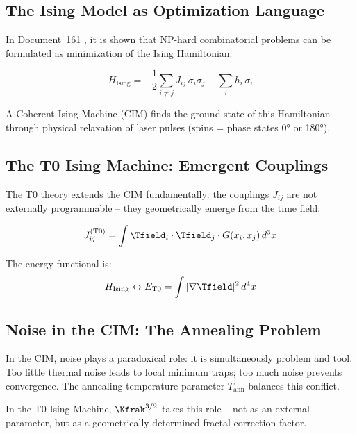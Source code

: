 \subsection{The Ising Model as Optimization Language}

In Document~161 \cite{pascher:ising}, it is shown that NP-hard combinatorial
problems can be formulated as minimization of the Ising Hamiltonian:

\begin{equation}
    H_{\text{Ising}} = -\frac{1}{2} \sum_{i \neq j} J_{ij} \, \sigma_i \sigma_j
    - \sum_i h_i \, \sigma_i
    \label{eq:ising}
\end{equation}

A Coherent Ising Machine (CIM) finds the ground state of this Hamiltonian through
physical relaxation of laser pulses (spins = phase states 0° or 180°).

\subsection{The T0 Ising Machine: Emergent Couplings}

The T0 theory extends the CIM fundamentally: the couplings $J_{ij}$ are not
externally programmable -- they geometrically emerge from the time field:

\begin{equation}
    J_{ij}^{(\text{T0})} = \int \Tfield_i \cdot \Tfield_j \cdot G(x_i, x_j) \, d^3x
    \label{eq:t0_coupling}
\end{equation}

The energy functional is:
\begin{equation}
    H_{\text{Ising}} \leftrightarrow E_{\text{T0}} = \int |\nabla \Tfield|^2 \, d^4x
    \label{eq:energy_equiv}
\end{equation}

\subsection{Noise in the CIM: The Annealing Problem}

In the CIM, noise plays a paradoxical role: it is simultaneously problem and tool.
Too little thermal noise leads to local minimum traps; too much noise prevents
convergence. The annealing temperature parameter $T_{\text{ann}}$ balances this
conflict.

In the T0 Ising Machine, $\Kfrak^{3/2}$ takes this role -- not as an external
parameter, but as a geometrically determined fractal correction factor.

